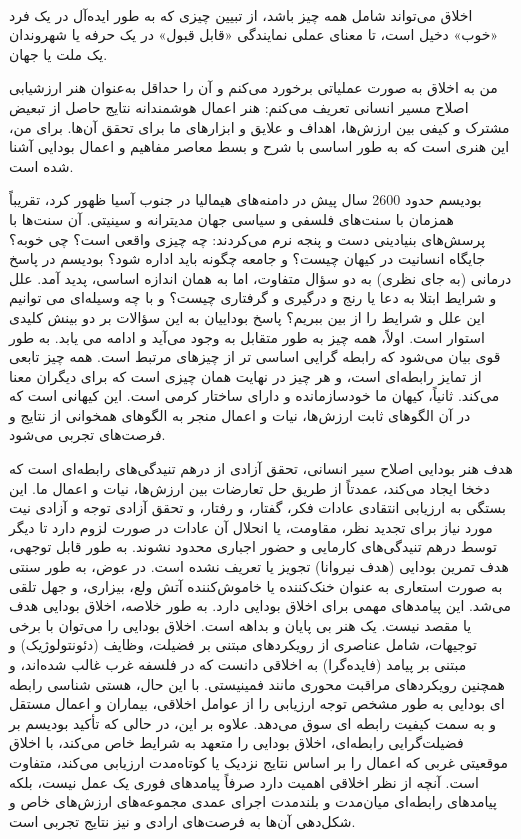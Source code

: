 \paragraph{}
اخلاق می‌تواند شامل همه چیز باشد، از تبیین چیزی که به طور ایده‌آل در یک فرد «خوب» دخیل است، تا معنای عملی نمایندگی «قابل قبول» در یک حرفه یا شهروندان یک ملت یا جهان.

من به اخلاق به صورت عملیاتی برخورد می‌کنم و آن را حداقل به‌عنوان هنر ارزشیابی اصلاح مسیر انسانی تعریف می‌کنم: هنر اعمال هوشمندانه نتایج حاصل از تبعیض مشترک و کیفی بین ارزش‌ها، اهداف و علایق و ابزارهای ما برای تحقق آن‌ها.
برای من، این هنری است که به طور اساسی با شرح و بسط معاصر مفاهیم و اعمال بودایی آشنا شده است.

بودیسم حدود 2600 سال پیش در دامنه‌های هیمالیا در جنوب آسیا ظهور کرد، تقریباً همزمان با سنت‌های فلسفی و سیاسی جهان مدیترانه و سینیتی.
آن سنت‌ها با پرسش‌های بنیادینی دست و پنجه نرم می‌کردند: چه چیزی واقعی است؟ چی خوبه؟ جایگاه انسانیت در کیهان چیست؟ و جامعه چگونه باید اداره شود؟ بودیسم در پاسخ درمانی (به جای نظری) به دو سؤال متفاوت، اما به همان اندازه اساسی، پدید آمد.
علل و شرایط ابتلا به دعا یا رنج و درگیری و گرفتاری چیست؟ و با چه وسیله‌ای می توانیم این علل و شرایط را از بین ببریم؟ پاسخ بوداییان به این سؤالات بر دو بینش کلیدی استوار است.
اولاً، همه چیز به طور متقابل به وجود می‌آید و ادامه می یابد.
به طور قوی بیان می‌شود که رابطه گرایی اساسی تر از چیزهای مرتبط است.
همه چیز تابعی از تمایز رابطه‌ای است، و هر چیز در نهایت همان چیزی است که برای دیگران معنا می‌کند.
ثانیاً، کیهان ما خودسازمانده و دارای ساختار کرمی است.
این کیهانی است که در آن الگوهای ثابت ارزش‌ها، نیات و اعمال منجر به الگوهای همخوانی از نتایج و فرصت‌های تجربی می‌شود.

هدف هنر بودایی اصلاح سیر انسانی، تحقق آزادی از درهم تنیدگی‌های رابطه‌ای است که دخخا ایجاد می‌کند، عمدتاً از طریق حل تعارضات بین ارزش‌ها، نیات و اعمال ما.
این بستگی به ارزیابی انتقادی عادات فکر، گفتار، و رفتار، و تحقق آزادی توجه و آزادی نیت مورد نیاز برای تجدید نظر، مقاومت، یا انحلال آن عادات در صورت لزوم دارد تا دیگر توسط درهم تنیدگی‌های کارمایی و حضور اجباری محدود نشوند.
به طور قابل توجهی، هدف تمرین بودایی (هدف نیروانا) تجویز یا تعریف نشده است.
در عوض، به طور سنتی به صورت استعاری به عنوان خنک‌کننده یا خاموش‌کننده آتش ولع، بیزاری، و جهل تلقی می‌شد.
این پیامدهای مهمی برای اخلاق بودایی دارد.
به طور خلاصه، اخلاق بودایی هدف یا مقصد نیست.
یک هنر بی پایان و بداهه است.
اخلاق بودایی را می‌توان با برخی توجیهات، شامل عناصری از رویکردهای مبتنی بر فضیلت، وظایف (دئونتولوژیک) و مبتنی بر پیامد (فایده‌گرا) به اخلاقی دانست که در فلسفه غرب غالب شده‌اند، و همچنین رویکردهای مراقبت محوری مانند فمینیستی.
با این حال، هستی شناسی رابطه ای بودایی به طور مشخص توجه ارزیابی را از عوامل اخلاقی، بیماران و اعمال مستقل و به سمت کیفیت رابطه ای سوق می‌دهد.
علاوه بر این، در حالی که تأکید بودیسم بر فضیلت‌گرایی رابطه‌ای، اخلاق بودایی را متعهد به شرایط خاص می‌کند، با اخلاق موقعیتی غربی که اعمال را بر اساس نتایج نزدیک یا کوتاه‌مدت ارزیابی می‌کند، متفاوت است.
آنچه از نظر اخلاقی اهمیت دارد صرفاً پیامدهای فوری یک عمل نیست، بلکه پیامدهای رابطه‌ای میان‌مدت و بلندمدت اجرای عمدی مجموعه‌های ارزش‌های خاص و شکل‌دهی آن‌ها به فرصت‌های ارادی و نیز نتایج تجربی است.


